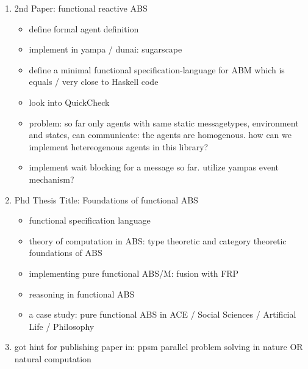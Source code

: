 \begin{enumerate}
\item 2nd Paper: functional reactive ABS
	\begin{itemize}
		\item define formal agent definition
		\item implement in yampa / dunai: sugarscape
		\item define a minimal functional specification-language for ABM which is equals / very close to Haskell code 
		\item look into QuickCheck
		\item problem: so far only agents with same static messagetypes, environment and states, can communicate: the agents are homogenous. how can we implement hetereogenous agents in this library?
		\item implement wait blocking for a message so far. utilize yampas event mechanism?
	\end{itemize}

\item Phd Thesis Title: Foundations of functional ABS
	\begin{itemize}
		\item functional specification language
		\item theory of computation in ABS: type theoretic and category theoretic foundations of ABS
		\item implementing pure functional ABS/M: fusion with FRP
		\item reasoning in functional ABS
		\item a case study: pure functional ABS in ACE / Social Sciences / Artificial Life / Philosophy
	\end{itemize}

\item got hint for publishing paper in: ppsm parallel problem solving in nature OR natural computation

\end{enumerate}